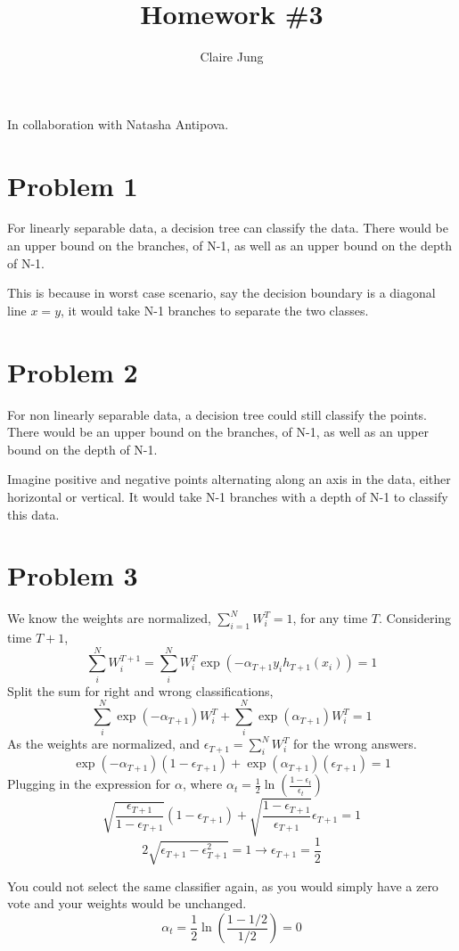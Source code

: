 \documentclass[]{article}
\title{Homework \#3}
\author{Claire Jung}
\begin{document}
\maketitle
In collaboration with Natasha Antipova.
\section*{Problem 1}
For linearly separable data, a decision tree can classify the data. There would be an upper bound on the branches, of N-1, as well as an upper bound on the depth of N-1. 

This is because in worst case scenario, say the decision boundary is a diagonal line $x=y$, it would take N-1 branches to separate the two classes. 

\section*{Problem 2}
For non linearly separable data, a decision tree could still classify the points. There would be an upper bound on the branches, of N-1, as well as an upper bound on the depth of N-1.  

Imagine positive and negative points alternating along an axis in the data, either horizontal or vertical. It would take N-1 branches with a depth of N-1 to classify this data.
\section*{Problem 3}
We know the weights are normalized, $\sum_{i=1}^{N}W_i^T = 1$, for any time $T$. Considering time $T+1$, 
\[
\sum_{i}^{N}W_i^{T+1} = \sum_{i}^{N}W_i^T\exp(-\alpha_{T+1}y_ih_{T+1}(x_i)) = 1
\]
Split the sum for right and wrong classifications,
\[
\sum_{i}^{N}\exp(-\alpha_{T+1})W_i^T + \sum_{i}^{N}\exp(\alpha_{T+1})W_i^T = 1
\]
As the weights are normalized, and $\epsilon_{T+1} = \sum_{i}^{N}W_i^T$ for the wrong answers. 
\[
\exp(-\alpha_{T+1})(1-\epsilon_{T+1})+\exp(\alpha_{T+1})(\epsilon_{T+1}) = 1
\]
Plugging in the expression for $\alpha$, where $\alpha_t = \frac{1}{2}\ln(\frac{1-\epsilon_t}{\epsilon_t})$
\[
\sqrt{\frac{\epsilon_{T+1}}{1-\epsilon_{T+1}}}(1-\epsilon_{T+1})+ \sqrt{\frac{1-\epsilon_{T+1}}{\epsilon_{T+1}}}\epsilon_{T+1} = 1
\]
\[
2\sqrt{\epsilon_{T+1}-\epsilon_{T+1}^2}=1\rightarrow\epsilon_{T+1}=\frac{1}{2}
\]

You could not select the same classifier again, as you would simply have a zero vote and your weights would be unchanged. 
\[
\alpha_t = \frac{1}{2}\ln(\frac{1-1/2}{1/2}) = 0
\] 
\end{document}
